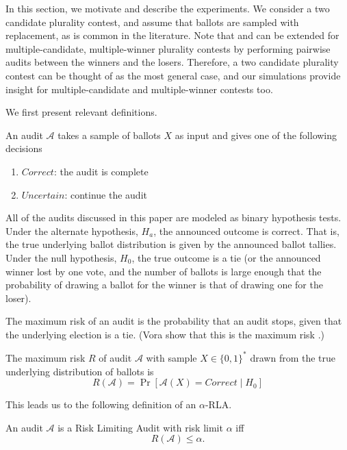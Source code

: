 In this section, we motivate and describe the experiments. We consider a two candidate plurality contest, and assume that ballots are sampled with replacement, as is common in the literature. Note that \BRAVO and \Minerva can be extended for multiple-candidate, multiple-winner plurality contests by performing pairwise audits between the winners and the losers\cite{RLA, arxiv_athena}. Therefore, a two candidate plurality contest can be thought of as the most general case, and our simulations provide insight for multiple-candidate and multiple-winner contests too.

We first present relevant definitions.

\begin{definition}
An audit $\mathcal{A}$ takes a sample of ballots $X$ as input and gives one of the 
following decisions
\begin{enumerate}
\item
$Correct$: the audit is complete
\item
$Uncertain$: continue the audit
\end{enumerate}
\end{definition}

All of the audits discussed in this paper are modeled as binary hypothesis tests. Under the alternate hypothesis, $H_a$, the announced outcome is correct. That is, the true underlying ballot distribution is given by the announced ballot tallies. Under the null hypothesis, $H_0$, the true outcome is a tie (or the announced winner lost by one vote, and the number of ballots is large enough that the probability of drawing a ballot for the winner is that of drawing one for the loser).

The maximum risk of an audit is the probability that an audit stops, given that the underlying election is a tie. (Vora show that this is the maximum risk \cite{Bayesian-RLA}.) 
\begin{definition}[Risk]
The maximum risk $R$ of audit $\mathcal{A}$ with sample $X\in \{0,1\}^*$ drawn from 
the true underlying distribution of ballots is
$$R(\mathcal{A})=\Pr[\mathcal{A}(X)=Correct \mid H_0]$$
\end{definition}

This leads us to the following definition of an $\alpha$-RLA.
\begin{definition}
An audit $\mathcal{A}$ is a Risk Limiting Audit with 
risk limit $\alpha$ iff 
$$R(\mathcal{A}) \le \alpha.$$
\end{definition}

